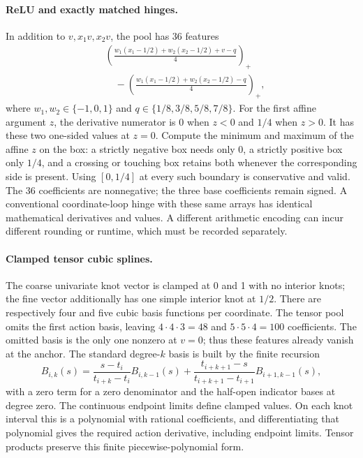 \paragraph{ReLU and exactly matched hinges.}
In addition to \(v,x_1v,x_2v\), the pool has 36 features
\[
\begin{aligned}
 &\left(\frac{w_1(x_1-1/2)+w_2(x_2-1/2)+v-q}{4}\right)_+\\
 &\hspace{1em}-
 \left(\frac{w_1(x_1-1/2)+w_2(x_2-1/2)-q}{4}\right)_+ ,
\end{aligned}
\]
where \(w_1,w_2\in\{-1,0,1\}\) and
\(q\in\{1/8,3/8,5/8,7/8\}\).
For the first affine argument \(z\), the derivative
numerator is 0 when \(z<0\) and \(1/4\) when \(z>0\).
It has these two one-sided values at \(z=0\).
Compute the minimum and maximum of the affine \(z\) on
the box: a strictly negative box needs only 0, a strictly
positive box only \(1/4\), and a crossing or touching box
retains both whenever the corresponding side is present.
Using \([0,1/4]\) at every such boundary is conservative
and valid.  The 36 coefficients are nonnegative; the
three base coefficients remain signed.
A conventional coordinate-loop hinge with these same
arrays has identical mathematical derivatives and values.
A different arithmetic encoding can incur different
rounding or runtime, which must be recorded separately.

\paragraph{Clamped tensor cubic splines.}
The coarse univariate knot vector is clamped at 0 and 1
with no interior knots; the fine vector additionally has
one simple interior knot at \(1/2\).
There are respectively four and five cubic basis
functions per coordinate.  The tensor pool omits the
first action basis, leaving \(4\cdot4\cdot3=48\) and
\(5\cdot5\cdot4=100\) coefficients.
The omitted basis is the only one nonzero at \(v=0\);
thus these features already vanish at the anchor.
The standard degree-\(k\) basis is built by the finite
recursion
\[
 B_{i,k}(s)=
 \frac{s-t_i}{t_{i+k}-t_i}B_{i,k-1}(s)
 +\frac{t_{i+k+1}-s}{t_{i+k+1}-t_{i+1}}B_{i+1,k-1}(s),
\]
with a zero term for a zero denominator and the
half-open indicator bases at degree zero.
The continuous endpoint limits define clamped values.
On each knot interval this is a polynomial with rational
coefficients, and differentiating that polynomial gives
the required action derivative, including endpoint
limits.  Tensor products preserve this finite
piecewise-polynomial form.

